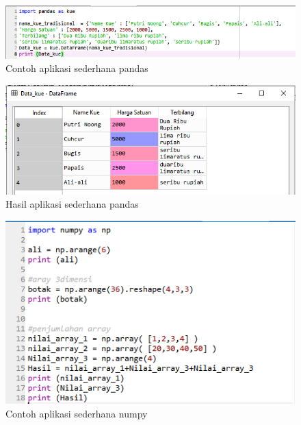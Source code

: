 \begin{figure}[ht]
      \centerline{\includegraphics[width=1\textwidth]
      {figures/cokro/c39}}
      \caption{Contoh aplikasi sederhana pandas}
      \label{c39}
      \end{figure}

\begin{figure}[ht]
      \centerline{\includegraphics[width=1\textwidth]
      {figures/cokro/c40}}
      \caption{Hasil aplikasi sederhana pandas}
      \label{c40}
      \end{figure}

\begin{figure}[ht]
      \centerline{\includegraphics[width=1\textwidth]
      {figures/cokro/c41}}
      \caption{Contoh aplikasi sederhana numpy}
      \label{c41}
      \end{figure}

